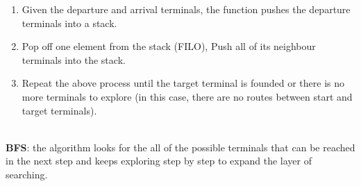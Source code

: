 \documentclass[fontsize=11pt]{article}
\begin{document}
\begin{enumerate}
\begin{enumerate}
        \item Given the departure and arrival terminals, the function pushes the departure terminals into a stack.
        \item Pop off one element from the stack (FILO), Push all of its neighbour terminals into the stack.
        \item Repeat the above process until the target terminal is founded or there is no more terminals to explore (in this case, there are no routes between start and target terminals).
    \end{enumerate}\\

    \textbf{BFS}: the algorithm looks for the all of the possible terminals that can be reached in the next step and keeps exploring step by step to expand the layer of searching.
        

\end{enumerate}
\end{document}
